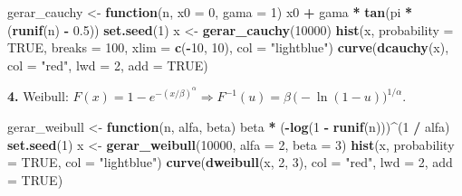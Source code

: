 \documentclass[
  portuguese,
  11pt,
  openany]{book}
\newenvironment{Shaded}{\begin{snugshade}}{\end{snugshade}}
\newcommand{\AttributeTok}[1]{\textcolor[rgb]{0.13,0.29,0.53}{#1}}
\newcommand{\ConstantTok}[1]{\textcolor[rgb]{0.56,0.35,0.01}{#1}}
\newcommand{\ControlFlowTok}[1]{\textcolor[rgb]{0.13,0.29,0.53}{\textbf{#1}}}
\newcommand{\DecValTok}[1]{\textcolor[rgb]{0.00,0.00,0.81}{#1}}
\newcommand{\FloatTok}[1]{\textcolor[rgb]{0.00,0.00,0.81}{#1}}
\newcommand{\FunctionTok}[1]{\textcolor[rgb]{0.13,0.29,0.53}{\textbf{#1}}}
\newcommand{\NormalTok}[1]{#1}
\newcommand{\OtherTok}[1]{\textcolor[rgb]{0.56,0.35,0.01}{#1}}
\newcommand{\SpecialCharTok}[1]{\textcolor[rgb]{0.81,0.36,0.00}{\textbf{#1}}}
\newcommand{\StringTok}[1]{\textcolor[rgb]{0.31,0.60,0.02}{#1}}
\begin{document}
\begin{Shaded}
\begin{Highlighting}[]
\NormalTok{gerar\_cauchy }\OtherTok{\textless{}{-}} \ControlFlowTok{function}\NormalTok{(n, }\AttributeTok{x0 =} \DecValTok{0}\NormalTok{, }\AttributeTok{gama =} \DecValTok{1}\NormalTok{) x0 }\SpecialCharTok{+}\NormalTok{ gama }\SpecialCharTok{*} \FunctionTok{tan}\NormalTok{(pi }\SpecialCharTok{*}\NormalTok{ (}\FunctionTok{runif}\NormalTok{(n) }\SpecialCharTok{{-}} \FloatTok{0.5}\NormalTok{))}
\FunctionTok{set.seed}\NormalTok{(}\DecValTok{1}\NormalTok{)}
\NormalTok{x }\OtherTok{\textless{}{-}} \FunctionTok{gerar\_cauchy}\NormalTok{(}\DecValTok{10000}\NormalTok{)}
\FunctionTok{hist}\NormalTok{(x, }\AttributeTok{probability =} \ConstantTok{TRUE}\NormalTok{, }\AttributeTok{breaks =} \DecValTok{100}\NormalTok{, }\AttributeTok{xlim =} \FunctionTok{c}\NormalTok{(}\SpecialCharTok{{-}}\DecValTok{10}\NormalTok{, }\DecValTok{10}\NormalTok{), }\AttributeTok{col =} \StringTok{"lightblue"}\NormalTok{)}
\FunctionTok{curve}\NormalTok{(}\FunctionTok{dcauchy}\NormalTok{(x), }\AttributeTok{col =} \StringTok{"red"}\NormalTok{, }\AttributeTok{lwd =} \DecValTok{2}\NormalTok{, }\AttributeTok{add =} \ConstantTok{TRUE}\NormalTok{)}
\end{Highlighting}
\end{Shaded}

\textbf{4.} Weibull: \(F(x) = 1 - e^{-(x/\beta)^\alpha} \Rightarrow
F^{-1}(u) = \beta\,\big(-\ln(1-u)\big)^{1/\alpha}\).

\begin{Shaded}
\begin{Highlighting}[]
\NormalTok{gerar\_weibull }\OtherTok{\textless{}{-}} \ControlFlowTok{function}\NormalTok{(n, alfa, beta) beta }\SpecialCharTok{*}\NormalTok{ (}\SpecialCharTok{{-}}\FunctionTok{log}\NormalTok{(}\DecValTok{1} \SpecialCharTok{{-}} \FunctionTok{runif}\NormalTok{(n)))}\SpecialCharTok{\^{}}\NormalTok{(}\DecValTok{1} \SpecialCharTok{/}\NormalTok{ alfa)}
\FunctionTok{set.seed}\NormalTok{(}\DecValTok{1}\NormalTok{)}
\NormalTok{x }\OtherTok{\textless{}{-}} \FunctionTok{gerar\_weibull}\NormalTok{(}\DecValTok{10000}\NormalTok{, }\AttributeTok{alfa =} \DecValTok{2}\NormalTok{, }\AttributeTok{beta =} \DecValTok{3}\NormalTok{)}
\FunctionTok{hist}\NormalTok{(x, }\AttributeTok{probability =} \ConstantTok{TRUE}\NormalTok{, }\AttributeTok{col =} \StringTok{"lightblue"}\NormalTok{)}
\FunctionTok{curve}\NormalTok{(}\FunctionTok{dweibull}\NormalTok{(x, }\DecValTok{2}\NormalTok{, }\DecValTok{3}\NormalTok{), }\AttributeTok{col =} \StringTok{"red"}\NormalTok{, }\AttributeTok{lwd =} \DecValTok{2}\NormalTok{, }\AttributeTok{add =} \ConstantTok{TRUE}\NormalTok{)}
\end{Highlighting}
\end{Shaded}
\end{document}
